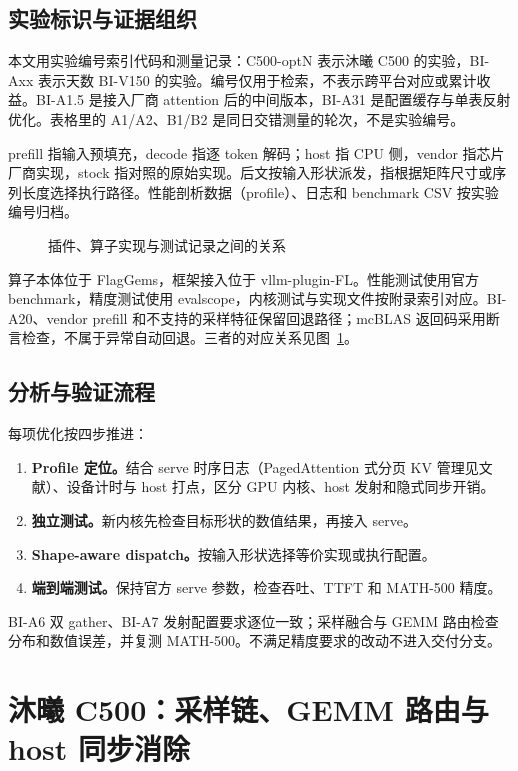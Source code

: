 \documentclass[11pt,a4paper]{ctexart}
\begin{document}
\subsection{实验标识与证据组织}
本文用实验编号索引代码和测量记录：C500-optN 表示沐曦 C500 的实验，BI-Axx 表示天数 BI-V150 的实验。编号仅用于检索，不表示跨平台对应或累计收益。BI-A1.5 是接入厂商 attention 后的中间版本，BI-A31 是配置缓存与单表反射优化。表格里的 A1/A2、B1/B2 是同日交错测量的轮次，不是实验编号。

prefill 指输入预填充，decode 指逐 token 解码；host 指 CPU 侧，vendor 指芯片厂商实现，stock 指对照的原始实现。后文按输入形状派发，指根据矩阵尺寸或序列长度选择执行路径。性能剖析数据（profile）、日志和 benchmark CSV 按实验编号归档。

\begin{figure}[!htbp]
\centering
\resizebox{\linewidth}{!}{}
\caption{插件、算子实现与测试记录之间的关系\label{fig:pipeline}}
\end{figure}

算子本体位于 FlagGems，框架接入位于 vllm-plugin-FL。性能测试使用官方 benchmark，精度测试使用 evalscope，内核测试与实现文件按附录索引对应。BI-A20、vendor prefill 和不支持的采样特征保留回退路径；mcBLAS 返回码采用断言检查，不属于异常自动回退。三者的对应关系见图~\ref{fig:pipeline}。

\subsection{分析与验证流程}
每项优化按四步推进：
\begin{enumerate}[label=（\arabic*）,leftmargin=3em]
  \item \textbf{Profile 定位。}结合 serve 时序日志（PagedAttention 式分页 KV 管理见文献\cite{vllm}）、设备计时与 host 打点，区分 GPU 内核、host 发射和隐式同步开销。
  \item \textbf{独立测试。}新内核先检查目标形状的数值结果，再接入 serve。
  \item \textbf{Shape-aware dispatch。}按输入形状选择等价实现或执行配置。
  \item \textbf{端到端测试。}保持官方 serve 参数，检查吞吐、TTFT 和 MATH-500 精度。
\end{enumerate}

BI-A6 双 gather、BI-A7 发射配置要求逐位一致；采样融合与 GEMM 路由检查分布和数值误差，并复测 MATH-500。不满足精度要求的改动不进入交付分支。

\section{沐曦 C500：采样链、GEMM 路由与 host 同步消除}\label{sec:c500}
\end{document}
